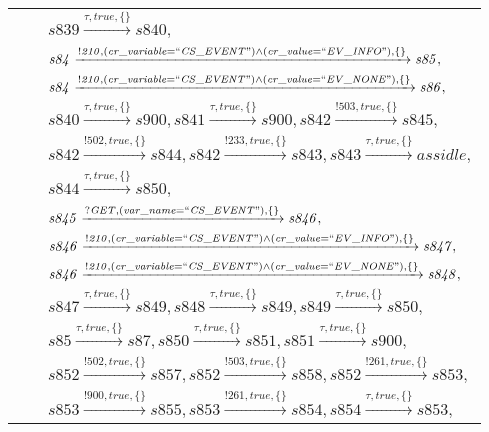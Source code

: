 \begin{tabular}{lcp{350px}}
& & $\mathit{s839}\xrightarrow{\mathit{\tau}, \mathit{true}, \{\}}\mathit{s840},$ \\
& & $\mathit{s84}\xrightarrow{\mathit{!210}, \mathit{(cr\_variable = ``CS\_EVENT") \land (cr\_value = ``EV\_INFO")}, \{\}}\mathit{s85},$ \\
& & $\mathit{s84}\xrightarrow{\mathit{!210}, \mathit{(cr\_variable = ``CS\_EVENT") \land (cr\_value = ``EV\_NONE")}, \{\}}\mathit{s86},$ \\
& & $\mathit{s840}\xrightarrow{\mathit{\tau}, \mathit{true}, \{\}}\mathit{s900},\mathit{s841}\xrightarrow{\mathit{\tau}, \mathit{true}, \{\}}\mathit{s900},\mathit{s842}\xrightarrow{\mathit{!503}, \mathit{true}, \{\}}\mathit{s845},$ \\
& & $\mathit{s842}\xrightarrow{\mathit{!502}, \mathit{true}, \{\}}\mathit{s844},\mathit{s842}\xrightarrow{\mathit{!233}, \mathit{true}, \{\}}\mathit{s843},\mathit{s843}\xrightarrow{\mathit{\tau}, \mathit{true}, \{\}}\mathit{assidle},$ \\
& & $\mathit{s844}\xrightarrow{\mathit{\tau}, \mathit{true}, \{\}}\mathit{s850},$ \\
& & $\mathit{s845}\xrightarrow{\mathit{?GET}, \mathit{(var\_name = ``CS\_EVENT")}, \{\}}\mathit{s846},$ \\
& & $\mathit{s846}\xrightarrow{\mathit{!210}, \mathit{(cr\_variable = ``CS\_EVENT") \land (cr\_value = ``EV\_INFO")}, \{\}}\mathit{s847},$ \\
& & $\mathit{s846}\xrightarrow{\mathit{!210}, \mathit{(cr\_variable = ``CS\_EVENT") \land (cr\_value = ``EV\_NONE")}, \{\}}\mathit{s848},$ \\
& & $\mathit{s847}\xrightarrow{\mathit{\tau}, \mathit{true}, \{\}}\mathit{s849},\mathit{s848}\xrightarrow{\mathit{\tau}, \mathit{true}, \{\}}\mathit{s849},\mathit{s849}\xrightarrow{\mathit{\tau}, \mathit{true}, \{\}}\mathit{s850},$ \\
& & $\mathit{s85}\xrightarrow{\mathit{\tau}, \mathit{true}, \{\}}\mathit{s87},\mathit{s850}\xrightarrow{\mathit{\tau}, \mathit{true}, \{\}}\mathit{s851},\mathit{s851}\xrightarrow{\mathit{\tau}, \mathit{true}, \{\}}\mathit{s900},$ \\
& & $\mathit{s852}\xrightarrow{\mathit{!502}, \mathit{true}, \{\}}\mathit{s857},\mathit{s852}\xrightarrow{\mathit{!503}, \mathit{true}, \{\}}\mathit{s858},\mathit{s852}\xrightarrow{\mathit{!261}, \mathit{true}, \{\}}\mathit{s853},$ \\
& & $\mathit{s853}\xrightarrow{\mathit{!900}, \mathit{true}, \{\}}\mathit{s855},\mathit{s853}\xrightarrow{\mathit{!261}, \mathit{true}, \{\}}\mathit{s854},\mathit{s854}\xrightarrow{\mathit{\tau}, \mathit{true}, \{\}}\mathit{s853},$ \\

\end{tabular}

